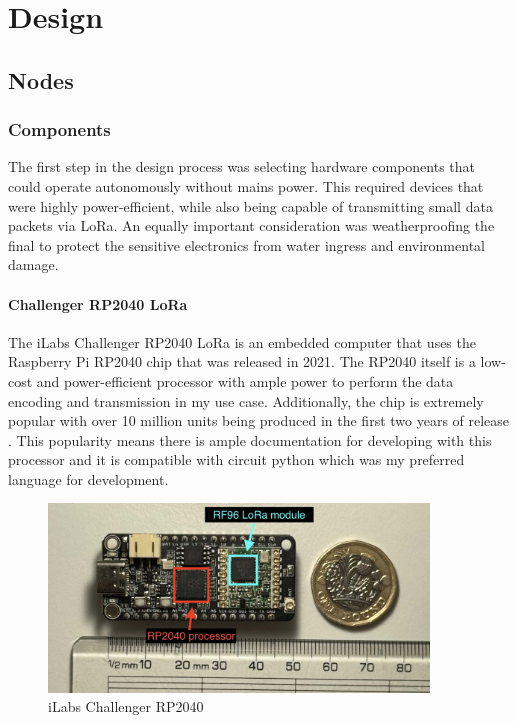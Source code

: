 \section{Design}

\subsection{Nodes}

\subsubsection{Components}

The first step in the design process was selecting hardware components that
could operate autonomously without mains power. This required devices that were
highly power-efficient, while also being capable of transmitting small data
packets via LoRa. An equally important consideration was weatherproofing the
final to protect the sensitive electronics from water ingress and environmental
damage.

\paragraph{Challenger RP2040 LoRa}

The iLabs Challenger RP2040 LoRa is an embedded computer that uses the Raspberry
Pi RP2040 chip that was released in 2021. The RP2040 itself is a low-cost and
power-efficient processor with ample power to perform the data encoding and
transmission in my use case. Additionally, the chip is extremely popular with
over 10 million units being produced in the first two years of release
\cite{pounder2023}. This popularity means there is ample documentation for
developing with this processor and it is compatible with circuit python which
was my preferred language for development.

\begin{figure}[H]
    \centering
    \includegraphics[width=0.9\textwidth]{contents/part-2/fig2/challenger-rp2040.jpg}
    \caption{iLabs Challenger RP2040}
    \label{fig:challenger-rp2040}
\end{figure}

